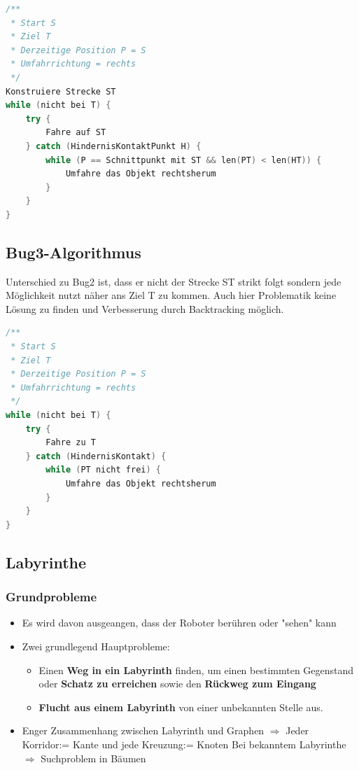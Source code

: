 \pagebreak

\begin{lstlisting}[language=c++, caption={Algorthmus ohne Backtracking}]
/**
 * Start S
 * Ziel T
 * Derzeitige Position P = S
 * Umfahrrichtung = rechts
 */
Konstruiere Strecke ST
while (nicht bei T) {
	try {
		Fahre auf ST
	} catch (HindernisKontaktPunkt H) {
		while (P == Schnittpunkt mit ST && len(PT) < len(HT)) {
			Umfahre das Objekt rechtsherum
		}
	}
}
\end{lstlisting}

\subsection{Bug3-Algorithmus}
Unterschied zu Bug2 ist, dass er nicht der Strecke ST strikt folgt sondern
jede Möglichkeit nutzt näher ans Ziel T zu kommen. Auch hier Problematik keine
Lösung zu finden und Verbesserung durch Backtracking möglich.

\begin{lstlisting}[language=c++, caption={Algorthmus ohne Backtracking}]
/**
 * Start S
 * Ziel T
 * Derzeitige Position P = S
 * Umfahrrichtung = rechts
 */
while (nicht bei T) {
	try {
		Fahre zu T
	} catch (HindernisKontakt) {
		while (PT nicht frei) {
			Umfahre das Objekt rechtsherum
		}
	}
}
\end{lstlisting}

\subsection{Labyrinthe}
\subsubsection{Grundprobleme}
\begin{itemize}
	\item Es wird davon ausgeangen, dass der Roboter berühren oder "sehen" kann
	\item Zwei grundlegend Hauptprobleme:
		\begin{itemize}
			\item Einen \textbf{Weg in ein Labyrinth} finden, um einen bestimmten
				Gegenstand oder \textbf{Schatz zu erreichen} sowie den \textbf{Rückweg
				zum Eingang}
			\item \textbf{Flucht aus einem Labyrinth} von einer unbekannten Stelle
				aus.
		\end{itemize}
	\item Enger Zusammenhang zwischen Labyrinth und Graphen $\Rightarrow$ Jeder
		Korridor:= Kante und jede Kreuzung:= Knoten
	\subitem Bei bekanntem Labyrinthe $\Rightarrow$ Suchproblem in Bäumen
\end{itemize}


